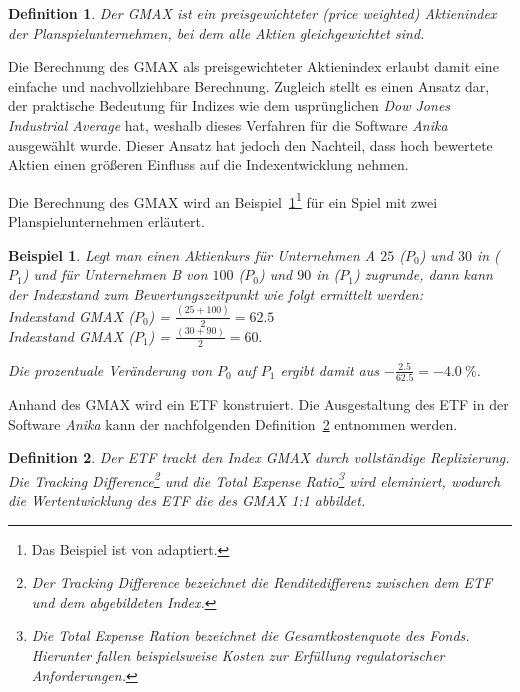 \documentclass[12pt, a4paper]{article}
\theoremstyle{plain}
\newtheorem{definition}{Definition}
\newtheorem{example}{Beispiel}
\begin{document}
\begin{definition}
	\label{def:gmax}
	Der \gls{GMAX} ist ein preisgewichteter (\textit{price weighted}) Aktienindex der Planspielunternehmen, bei dem alle Aktien gleichgewichtet sind.
\end{definition}

Die Berechnung des \gls{GMAX} als preisgewichteter Aktienindex erlaubt damit eine einfache und nachvollziehbare Berechnung. Zugleich stellt es einen Ansatz dar, der praktische Bedeutung für Indizes wie dem usprünglichen \textit{Dow Jones Industrial Average} hat, weshalb dieses Verfahren für die Software \textit{Anika} ausgewählt wurde. Dieser Ansatz hat jedoch den Nachteil, dass hoch bewertete Aktien einen größeren Einfluss auf die Indexentwicklung nehmen.

Die Berechnung des \gls{GMAX} wird an Beispiel~\ref{ex:gmax}\footnote{Das Beispiel ist von \textcite[][S.~44]{bodie_investments_2018} adaptiert.} für ein Spiel mit zwei Planspielunternehmen erläutert.

\begin{example}
\label{ex:gmax}
Legt man einen Aktienkurs für Unternehmen A $25$ ($P_0$) und $30$ in ($P_1$) und für Unternehmen B von $100$ ($P_0$) und $90$ in ($P_1$) zugrunde, dann kann der Indexstand zum Bewertungszeitpunkt wie folgt ermittelt werden:\\
Indexstand \gls{GMAX} ($P_0$) = $\frac{(25 + 100)}{2} = 62.5$\\
Indexstand \gls{GMAX} ($P_1$) = $\frac{(30 + 90)}{2} = 60.$

Die prozentuale Veränderung von $P_0$ auf $P_1$ ergibt damit aus $-\frac{2.5}{62.5} = -4.0~\%$.
\end{example}

 Anhand des \gls{GMAX} wird ein \gls{ETF} konstruiert. Die Ausgestaltung des \gls{ETF} in der Software \textit{Anika} kann der nachfolgenden Definition~\ref{def:etf} entnommen werden.
\begin{definition}
	\label{def:etf}
	Der \gls{ETF} trackt den Index \gls{GMAX} durch vollständige Replizierung. Die \textit{Tracking Difference}\footnote{Der \textit{Tracking Difference} bezeichnet die Renditedifferenz zwischen dem \gls{ETF} und dem abgebildeten Index.} und die \textit{Total Expense Ratio}\footnote{Die \textit{Total Expense Ration} bezeichnet die Gesamtkostenquote des Fonds. Hierunter fallen beispielsweise Kosten zur Erfüllung regulatorischer Anforderungen.} wird eleminiert, wodurch die Wertentwicklung des \gls{ETF} die des \gls{GMAX} 1:1 abbildet.
\end{definition}
\end{document}
